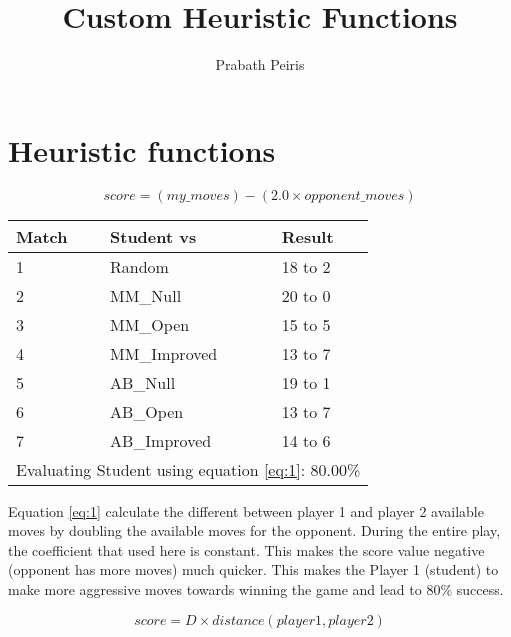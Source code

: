 \documentclass{article}
\begin{document}
\author{Prabath Peiris}
\title{Custom Heuristic Functions}
\date{}
\maketitle

\section*{Heuristic functions}

\begin{equation}
score = (my\_moves) - (2.0 \times opponent\_moves)
\label{eq:1}
\end{equation}

\begin{center}
\begin{tabular}{|l|l|l|} \hline
	Match & Student vs & Result \\ \hline
	1 & Random & 18 to 2 \\
	2 & MM\_Null & 20 to 0 \\
	3 & MM\_Open & 15 to 5 \\
	4 & MM\_Improved & 13 to 7 \\
	5 & AB\_Null & 19 to 1 \\
	6 & AB\_Open & 13 to 7 \\
	7 & AB\_Improved & 14 to 6 \\ \hline\hline
	\multicolumn{3}{|l|}{Evaluating Student using equation \ref{eq:1}: 80.00\% } \\ \hline
\end{tabular}
\end{center}

Equation \ref{eq:1} calculate the different between player 1 and player 2 available moves by doubling the available moves for the opponent. During the entire play, the coefficient that used here is constant. This makes the score value negative (opponent has more moves) much quicker. This makes the Player 1 (student) to make more aggressive moves towards winning the game and lead to $80\%$ success.



\begin{equation}
score = D \times distance(player1, player2)
\label{eq:2}
\end{equation}
\end{document}
